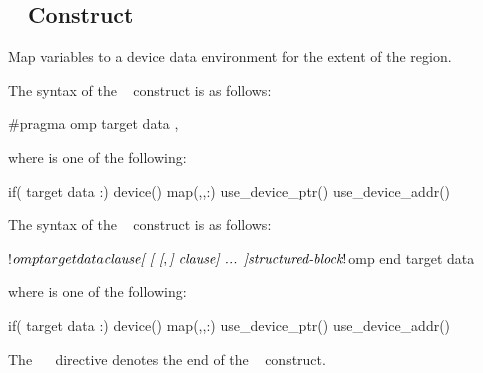 \subsection{~ Construct}
\label{subsec:target data Construct}
\summary
 Map variables to a device data environment for the extent of the region.
\syntax
\begin{ccppspecific}
The syntax of the ~ construct is as follows:

\begin{ompcPragma}
#pragma omp target data \plc{clause[ [ [},\plc{] clause] ... ] new-line}
\end{ompcPragma}

\begin{samepage}
where  is one of the following:

\begin{indentedcodelist}
if(\plc{[} target data :\plc{] scalar-expression})
device()
map(\plc{[[map-type-modifier[},\plc{] [map-type-modifier[},\plc{] ...] map-type}:\plc{ ] locator-list})
use_device_ptr()
use_device_addr()
\end{indentedcodelist}
\end{samepage}
\end{ccppspecific}
\medskip

\begin{fortranspecific}
The syntax of the ~ construct is as follows:

\begin{ompfPragma}
!$omp target data \plc{clause[ [ [},\plc{] clause] ... ]}
    \plc{structured-block}
!$omp end target data
\end{ompfPragma}

where  is one of the following:

\begin{indentedcodelist}
if(\plc{[} target data :\plc{] scalar-logical-expression})
device()
map(\plc{[[map-type-modifier[},\plc{] [map-type-modifier[},\plc{] ...] map-type}:\plc{ ] locator-list})
use_device_ptr()
use_device_addr()
\end{indentedcodelist}

The ~~ directive denotes the end of the ~ construct.
\end{fortranspecific}

